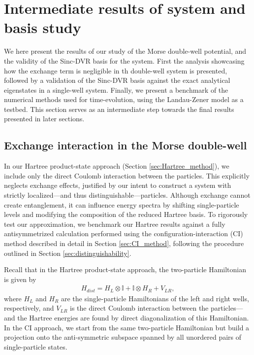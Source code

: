 \documentclass{subfiles}
\begin{document}
\section{Intermediate results of system and basis study}\label{sec:general_study_results}
We here present the results of our study of the Morse double-well potential, and the validity of the Sinc-DVR basis for the system. First the analysis showcasing how the exchange term is negligible in th double-well system is presented, followed by a validation of the Sinc-DVR basis against the exact analytical eigenstates in a single-well system. Finally, we present a benchmark of the numerical methods used for time-evolution, using the Landau-Zener model as a testbed. This section serves as an intermediate step towards the final results presented in later sections.

\subsection{Exchange interaction in the Morse double-well}\label{sec:exchange_interaction}
In our Hartree product-state approach (Section \ref{sec:Hartree_method}), we include only the direct Coulomb interaction between the particles. This explicitly neglects exchange effects, justified by our intent to construct a system with strictly localized—and thus distinguishable—particles. Although exchange cannot create entanglement, it can influence energy spectra by shifting single-particle levels and modifying the composition of the reduced Hartree basis. To rigorously test our approximation, we benchmark our Hartree results against a fully antisymmetrized calculation performed using the configuration-interaction (CI) method described in detail in Section \ref{sec:CI_method}, following the procedure outlined in Section \ref{sec:distinguishability}.

Recall that in the Hartree product-state approach, the two-particle Hamiltonian is given by
\begin{align*}
    H_{dist} = H_L \otimes \mathbb{I} + \mathbb{I} \otimes H_R + V_{LR},
\end{align*}
where $H_L$ and $H_R$ are the single-particle Hamiltonians of the left and right wells, respectively, and $V_{LR}$ is the direct Coulomb interaction between the particles—and the Hartree energies are found by direct diagonalization of this Hamiltonian. In the CI approach, we start from the same two-particle Hamiltonian but build a projection onto the anti-symmetric subspace spanned by all unordered pairs of single-particle states. 
\end{document}

